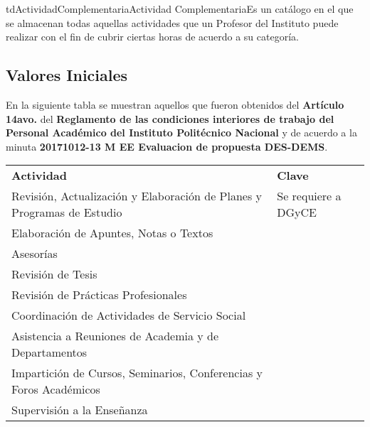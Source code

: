 \begin{TipoDeDato}{tdActividadComplementaria}{Actividad Complementaria}{Es un catálogo en el que se almacenan todas aquellas actividades que un Profesor del Instituto puede realizar con el fin de cubrir ciertas horas de acuerdo a su categoría.}
	
	\begin{tdAtributos}
			
	\end{tdAtributos}
	
	\subsection{Valores Iniciales}
	
	En la siguiente tabla se muestran aquellos que fueron obtenidos del \textbf{Artículo 14avo.} del \textbf{Reglamento de las condiciones interiores de trabajo del Personal Académico del Instituto Politécnico Nacional} y de acuerdo a la minuta \textbf{20171012-13 M EE Evaluacion de propuesta DES-DEMS}. 
	
	\begin{longtable}{|p{}|p{}|}
	\rowcolor{colorPrincipal}
	\multicolumn{2}{|c|}{\bf \color{white} Valores Iniciales}\\
	\hline
	\rowcolor{colorSecundario}
	\bf \color{white} Actividad & \bf\color{white} Clave \\
	\hline
	Revisión, Actualización y Elaboración de Planes y Programas de Estudio & \TODO Se requiere a DGyCE\\
	\hline
	Elaboración de Apuntes, Notas o Textos & \\
	\hline
	Asesorías & \\
	\hline
	Revisión de Tesis & \\
	\hline
	Revisión de Prácticas Profesionales & \\
	\hline
	Coordinación de Actividades de Servicio Social & \\
	\hline
	Asistencia a Reuniones de Academia y de Departamentos & \\
	\hline
	Impartición de Cursos,  Seminarios, Conferencias y Foros Académicos & \\
	\hline
	Supervisión a la Enseñanza & \\
	\hline
	\end{longtable}
\end{TipoDeDato}

